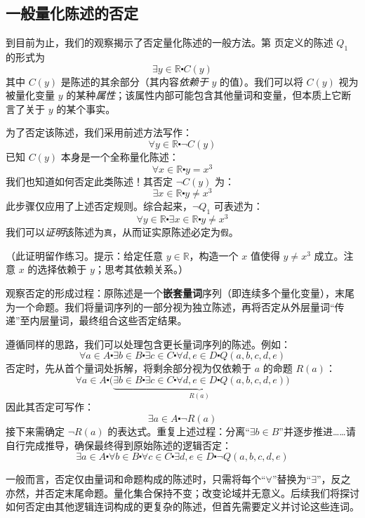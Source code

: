 \subsection{一般量化陈述的否定}

到目前为止，我们的观察揭示了否定量化陈述的一般方法。第 \pageref{sec:section4.4} 页定义的陈述 $Q_1$ 的形式为
\[\exists y \in \mathbb{R} \centerdot C(y)\]
其中 $C(y)$ 是陈述的其余部分（其内容\emph{依赖于} $y$ 的值）。我们可以将 $C(y)$ 视为被量化变量 $y$ 的某种\emph{属性}；该属性内部可能包含其他量词和变量，但本质上它断言了关于 $y$ 的某个事实。

为了否定该陈述，我们采用前述方法写作：
\[\forall y \in \mathbb{R} \centerdot \neg C(y)\]
已知 $C(y)$ 本身是一个全称量化陈述：
\[\forall x \in \mathbb{R} \centerdot y = x^3\]
我们也知道如何否定此类陈述！其否定 $\neg C(y)$ 为：
\[\exists x \in \mathbb{R} \centerdot y \ne x^3\]
此步骤仅应用了上述否定规则。综合起来，$\neg Q_1$ 可表述为：
\[\forall y \in \mathbb{R} \centerdot \exists x \in \mathbb{R} \centerdot y \ne x^3\]
我们可以\emph{证明}该陈述为\verb|真|，从而证实原陈述必定为\verb|假|。

（此证明留作练习。提示：给定任意 $y \in \mathbb{R}$，构造一个 $x$ 值使得 $y \ne x^3$ 成立。注意 $x$ 的选择依赖于 $y$；思考其依赖关系。）

观察否定的形成过程：原陈述是一个\textbf{嵌套量词}序列（即连续多个量化变量），末尾为一个命题。我们将量词序列的一部分视为独立陈述，再将否定从外层量词``传递''至内层量词，最终组合这些否定结果。

遵循同样的思路，我们可以处理包含更长量词序列的陈述。例如：
\[\forall a \in A \centerdot \exists b \in B \centerdot \exists c \in C \centerdot \forall d, e \in D \centerdot Q(a, b, c, d, e)\]
否定时，先从首个量词处拆解，将剩余部分视为仅依赖于 $a$ 的命题 $R(a)$：
\[\forall a \in A \centerdot \big(\underbrace{\exists b \in B \centerdot \exists c \in C \centerdot \forall d, e \in D \centerdot Q(a, b, c, d, e)}_{R(a)}\big)\]
因此其否定可写作：
\[\exists a \in A \centerdot \neg R(a)\]
接下来需确定 $\neg R(a)$ 的表达式。重复上述过程：分离``$\exists b \in B$''并逐步推进……请自行完成推导，确保最终得到原始陈述的逻辑否定：
\[\exists a \in A \centerdot \forall b \in B \centerdot \forall c \in C \centerdot \exists d, e \in D \centerdot \neg Q(a, b, c, d, e)\]

一般而言，否定仅由量词和命题构成的陈述时，只需将每个``$\forall$''替换为``$\exists$''，反之亦然，并否定末尾命题。量化集合保持不变；改变论域并无意义。后续我们将探讨如何否定由其他逻辑连词构成的更复杂的陈述，但首先需要定义并讨论这些连词。
